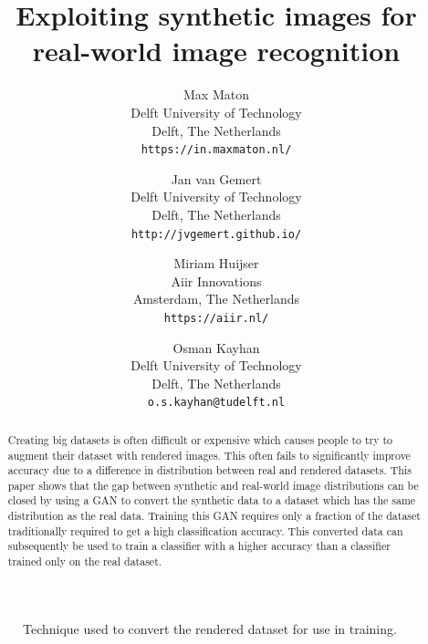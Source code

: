 \documentclass[10pt,twocolumn,letterpaper]{article}
\begin{document}
\title{ Exploiting synthetic images for real-world image recognition }

\author{Max Maton\\
Delft University of Technology\\
Delft, The Netherlands\\
{\tt\small https://in.maxmaton.nl/}
\and
Jan van Gemert\\
Delft University of Technology\\
Delft, The Netherlands\\
{\tt\small http://jvgemert.github.io/}
\and
Miriam Huijser\\
Aiir Innovations\\
Amsterdam, The Netherlands\\
{\tt\small https://aiir.nl/}
\and
Osman Kayhan\\
Delft University of Technology\\
Delft, The Netherlands\\
{\tt\small o.s.kayhan@tudelft.nl}
}

\maketitle

\begin{abstract}
Creating big datasets is often difficult or expensive which causes people to try to augment their dataset with rendered images. This often fails to significantly improve accuracy due to a difference in distribution between real and rendered datasets.
This paper shows that the gap between synthetic and real-world image distributions can be closed by using a GAN to convert the synthetic data to a dataset which has the same distribution as the real data. Training this GAN requires only a fraction of the dataset traditionally required to get a high classification accuracy. This converted data can subsequently be used to train a classifier with a higher accuracy than a classifier trained only on the real dataset.

\end{abstract}

\begin{figure}[h]
\begin{center}
{\scriptsize }
\end{center}
   \caption{Technique used to convert the rendered dataset for use in training.}
\label{fig:method}
\end{figure}
\end{document}
